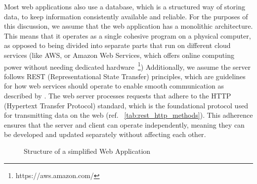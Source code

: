 Most web applications also use a database, which is a structured way of storing data, to keep information consistently available and reliable. For the purposes of this discussion, we assume that the web application has a monolithic architecture. This means that it operates as a single cohesive program on a physical computer, as opposed to being divided into separate parts that run on different cloud services (like AWS, or Amazon Web Services, which offers online computing power without needing dedicated hardware~\footnote{https://aws.amazon.com/})
Additionally, we assume the server follows REST (Representational State Transfer) principles, which are guidelines for how web services should operate to enable smooth communication as described by \citet{roy_t_fielding_rest_2008}. 
The web server processes requests that adhere to the HTTP (Hypertext Transfer Protocol) standard, which is the foundational protocol used for transmitting data on the web (ref. ~\autoref{tab:rest_http_methods}).
This adherence ensures that the server and client can operate independently, meaning they can be developed and updated separately without affecting each other\cite{fielding_http_2022}.

\begin{figure}[h]
    \centering
    \caption{Structure of a simplified Web Application}
    \label{fig:simplified-web-app}

\end{figure}


